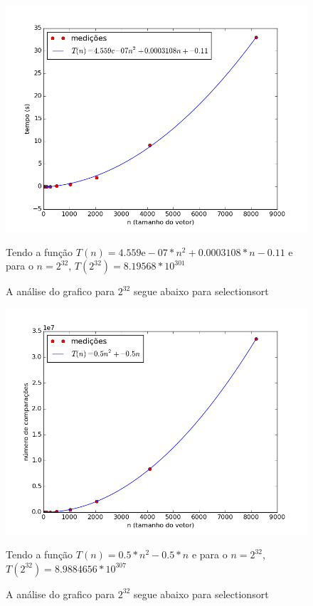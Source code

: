 \documentclass[12pt,a4paper,twoside]{report}
\begin{document}


\begin{figure}[ht]
\centering \includegraphics[scale=0.8]{../selectionsort/imagens/selectionsortQuaseCresc200.png}
\caption{A análise do grafico para $2^{32}$ segue abaixo para selectionsort}

Tendo a função $T(n) = 4.559\mathrm{e}-07*n^{2}+0.0003108*n-0.11$ e para o $n =2^{32}$, $T(2^{32}) = 8.19568*10^{301}$
\label{fig:selectionsortQuaseCresc200}
\end{figure}

\begin{figure}[ht]
\centering \includegraphics[scale=0.8]{../selectionsort/imagens/selectionsortQuaseCresc201.png}
\caption{A análise do grafico para $2^{32}$ segue abaixo para selectionsort}

Tendo a função $T(n) = 0.5*n^{2}-0.5*n$ e para o $n =2^{32}$, $T(2^{32}) =8.9884656 * 10^{307}$
\label{fig:selectionsortQuaseCresc201}
\end{figure}
\end{document}
